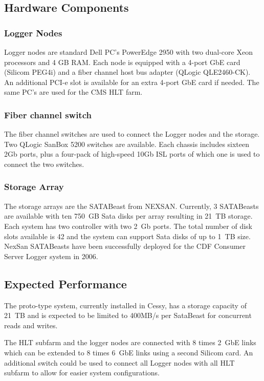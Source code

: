 \subsection{Hardware Components}
\subsubsection{Logger Nodes}
Logger nodes are standard Dell PC's PowerEdge 2950 with two dual-core Xeon processors and 4 GB RAM. Each node is equipped with a 4-port GbE card (Silicom PEG4i) and a fiber channel host bus adapter (QLogic QLE2460-CK). An additional PCI-e slot is available for an extra 4-port GbE card if needed. The same PC's are used for the CMS HLT farm.

\subsubsection{Fiber channel switch}
The fiber channel switches are used to connect the Logger nodes and the storage. Two QLogic SanBox 5200 switches are available. Each chassis includes sixteen 2Gb ports, plus a four-pack of high-speed 10Gb ISL ports of which one is used to connect the two switches.

\subsubsection{Storage Array}
The storage arrays are the SATABeast from NEXSAN. Currently, 3 SATABeasts are available with ten 750~GB Sata disks per array resulting in 21~TB storage. Each system has two controller with two 2~Gb ports.
The total number of disk slots available is 42 and the system can support Sata disks of up to 1~TB size. NexSan SATABeasts have been successfully deployed for the CDF Consumer Server Logger system in 2006.

\subsection{Expected Performance}
The proto-type system, currently installed in Cessy, has a storage capacity of 21~TB and is expected to be limited to 400MB/s per SataBeast for concurrent reads and writes. 

The HLT subfarm and the logger nodes are connected with 8 times 2~GbE links which can be extended to 8 times 6~GbE links using a second Silicom card. An additional switch could be used to connect all Logger nodes with all HLT subfarm to allow for easier system configurations.

